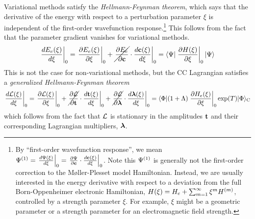 \documentclass[11pt]{article}
\numberwithin{equation}{section}
\begin{document}
\begin{samepage}
\begin{rmk}
Variational methods satisfy the \textit{Hellmann-Feynman theorem}, which says that the derivative of the energy with respect to a perturbation parameter $\xi$ is independent of the first-order wavefunction response.\footnote{By ``first-order wavefunction response'', we mean $\Y\ord{1}=\left.\fd{\Y(\xi)}{\xi}\right|_0=\left.\pd{\Y}{\bo{c}}\cdot\fd{\bo{c}(\xi)}{\xi}\right|_0$.  Note this $\Psi ^{(1)}$ is generally not the first-order correction to the M\o ller-Plesset model Hamiltonian.
Instead, we are usually interested in the energy derivative with respect to a deviation from the full Born-Oppenheimer electronic Hamiltonian, $H(\xi)=H_e+\sum_{m=1}^{\infty} \xi^m H\ord{m}$, controlled by a strength parameter $\xi$.  For example, $\xi$ might be a geometric parameter or a strength parameter for an electromagnetic field strength.}
This follows from the fact that the parameter gradient vanishes for variational methods.
\begin{align}
  \left.
  \fd{E_e(\xi)}{\xi}
  \right|_0
=
  \left.
  \pd{E_e(\xi)}{\xi}
  \right|_0
+
  \left.
  \cancel{
  \pd{E_e}{\bo{c}}
  }
  \cdot
  \fd{\bo{c}(\xi)}{\xi}
  \right|_0
=
  \ip{\Y|
  \left.
  \pd{H(\xi)}{\xi}
  \right|_0
  |\Y}
\end{align}
This is not the case for non-variational methods, but the CC Lagrangian satisfies a
\textit{generalized Hellmann-Feynman theorem}
\begin{align}
  \left.
  \fd{\mc{L}(\xi)}{\xi}
  \right|_0
=
  \left.
  \pd{\mc{L}(\xi)}{\xi}
  \right|_0
+
  \left.
  \cancel{
  \pd{\mc{L}}{\bo{t}}
  }
  \cdot
  \fd{\bo{t}(\xi)}{\xi}
  \right|_0
+
  \left.
  \cancel{
  \pd{\mc{L}}{\bm{\la}}
  }
  \cdot
  \fd{\bm{\la}(\xi)}{\xi}
  \right|_0
=
  \ip{\F|
    (
      1
    +
      \La
    )
    \left.
    \pd{H_e(\xi)}{\xi}
    \right|_0
    \mr{exp}(T)
  |\F}_\mr{C}
\end{align}
which follows from the fact that
$\mathcal{L}$ is stationary in the amplitudes $\mathbf{t}$ and their corresponding Lagrangian multipliers, $\bm{\la}$.
\end{rmk}
\end{samepage}
\end{document}

